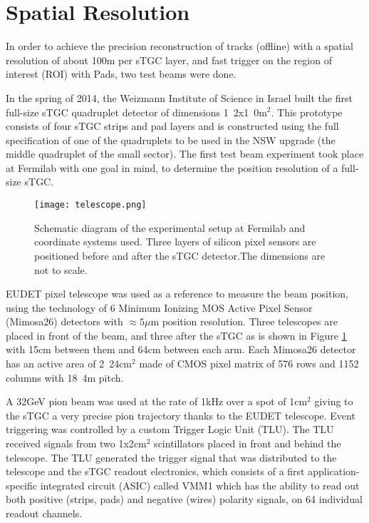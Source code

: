 

\section{Spatial Resolution}\label{resolution}

In order to achieve the precision reconstruction of tracks (offline) with a spatial resolution of about
\unit{100}{\micro m} per sTGC layer, and fast trigger on the region of interest (ROI) with Pads, two test beams were
done.\par

In the spring of 2014, the Weizmann Institute of Science in Israel built the first full-size sTGC quadruplet detector of
dimensions \unit{1.2x1.0}{m$^2$}. This prototype consists of four sTGC strips and pad layers and is constructed using the
full specification of one of the quadruplets to be used in the NSW upgrade (the middle quadruplet of the small sector).
The first test beam experiment took place at Fermilab with one goal in mind, to determine the position resolution of a
full-size sTGC.\par

\begin{figure}[t]
\centering
\texttt{[image: telescope.png]}
\caption{\small Schematic diagram of
the experimental setup at Fermilab and coordinate systems used. Three layers of silicon pixel sensors are positioned
before and after the sTGC detector.The dimensions are not to scale.}\label{fig:telescope}
\end{figure}


EUDET pixel telescope was used as a reference to measure the beam position, using the technology of 6 Minimum Ionizing
MOS Active Pixel Sensor (Mimosa26) detectors with $\approx 5 \mu$m position resolution. Three telescopes are placed in
front of the beam, and three after the sTGC as is shown in Figure \ref{fig:telescope} with \unit{15}{cm} between them
and \unit{64}{cm} between each arm.  Each Mimosa26 detector has an active area of \unit{2.24}{cm$^2$} made of CMOS
pixel matrix of 576 rows and 1152 columns with \unit{18.4}{\micro m} pitch.\par


A \unit{32}{GeV} pion beam was used at the rate of \unit{1}{kHz} over a spot of \unit{1}{cm$^2$} giving to the sTGC a
very precise pion trajectory thanks to the EUDET telescope.  Event triggering was controlled by a custom Trigger Logic
Unit (TLU). The TLU received signals from two \unit{1x2}{cm$^2$} scintillators placed in front and behind the telescope.
The TLU generated the trigger signal that was distributed to the telescope and the sTGC readout electronics, which
consists of a first application-specific integrated circuit (ASIC) called VMM1 which has the ability to read out both
positive (strips, pads) and negative (wires) polarity signals, on 64 individual readout channels.\par
	
